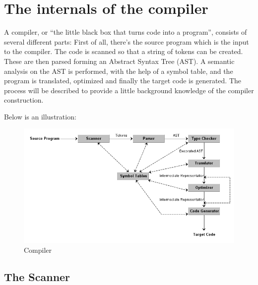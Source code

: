 \section{The internals of the compiler}

A compiler, or ``the little black box that turns code into a program'', consists of several different parts: First of all, there's the source program which is the input to the compiler. The code is scanned so that a string of tokens can be created. These are then parsed forming an Abstract Syntax Tree (AST). A semantic analysis on the AST is performed, with the help of a symbol table, and the program is translated, optimized and finally the target code is generated. The process will be described to provide a little background knowledge of the compiler construction. 

Below is an illustration:

\begin{figure}[ht]
	\centering
		\includegraphics[scale = 0.5]{img/compiler.png}
	\caption{Compiler}
	\label{fig:compiler}
\end{figure}


\subsection{The Scanner}

